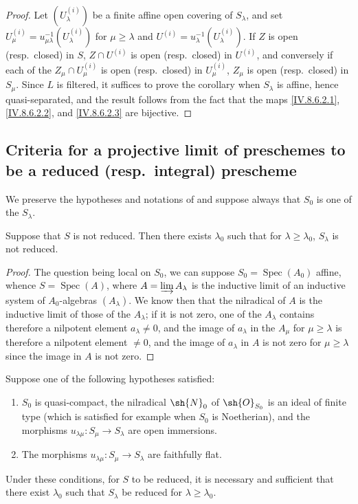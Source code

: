 \begin{proof}
Let $(U_\lambda^{(i)})$ be a finite affine open covering of $S_\lambda$, and set $U^{(i)}_\mu=u_{\mu\lambda}^{-1}(U_\lambda^{(i)})$ for $\mu\geqslant\lambda$ and $U^{(i)}=u_\lambda^{-1}(U_\lambda^{(i)})$.
If $Z$ is open (resp.\ closed) in $S$, $Z\cap U^{(i)}$ is open (resp.\ closed) in $U^{(i)}$, and conversely if each of the $Z_\mu\cap U^{(i)}_\mu$ is open (resp.\ closed) in $U^{(i)}_\mu$, $Z_\mu$ is open (resp.\ closed) in $S_\mu$.
Since $L$ is filtered, it suffices to prove the corollary when $S_\lambda$ is affine, hence quasi-separated, and the result follows from the fact that the maps \eqref{IV.8.6.2.1}, \eqref{IV.8.6.2.2}, and \eqref{IV.8.6.2.3} are bijective.
\end{proof}

\subsection{Criteria for a projective limit of preschemes to be a reduced (resp.\ integral) prescheme}
\label{subsection:IV.8.7}

We preserve the hypotheses and notations of  and suppose always that $S_0$ is one of the $S_\lambda$.

\begin{proposition}[8.7.1]
\label{IV.8.7.1}
Suppose that $S$ is not reduced.
Then there exists $\lambda_0$ such that for $\lambda\geqslant\lambda_0$, $S_\lambda$ is not reduced.
\end{proposition}

\begin{proof}
The question being local on $S_0$, we can suppose $S_0=\operatorname{Spec}(A_0)$ affine, whence $S=\operatorname{Spec}(A)$, where $A=\varinjlim A_\lambda$ is the inductive limit of an inductive system of $A_0$-algebras $(A_\lambda)$.
We know then  that the nilradical of $A$ is the inductive limit of those of the $A_\lambda$; if it is not zero, one of the $A_\lambda$ contains therefore a nilpotent element $a_\lambda\neq 0$, and the image of $a_\lambda$ in the $A_\mu$ for $\mu\geqslant\lambda$ is therefore a nilpotent element $\neq 0$, and the image of $a_\lambda$ in $A$ is not zero for $\mu\geqslant\lambda$ since the image in $A$ is not zero.
\end{proof}

\begin{proposition}[8.7.2]
\label{IV.8.7.2}
Suppose one of the following hypotheses satisfied:
\begin{enumerate}[label=\emph{\alph*)}]
\item $S_0$ is quasi-compact, the nilradical $\sh{N}_0$ of $\sh{O}_{S_0}$ is an ideal of finite type (which is satisfied for example when $S_0$ is Noetherian), and the morphisms $u_{\lambda\mu}:S_\mu\to S_\lambda$ are open immersions.
\item The morphisms $u_{\lambda\mu}:S_\mu\to S_\lambda$ are faithfully flat.
\end{enumerate}
Under these conditions, for $S$ to be reduced, it is necessary and sufficient that there exist $\lambda_0$ such that $S_\lambda$ be reduced for $\lambda\geqslant\lambda_0$.
\end{proposition}

